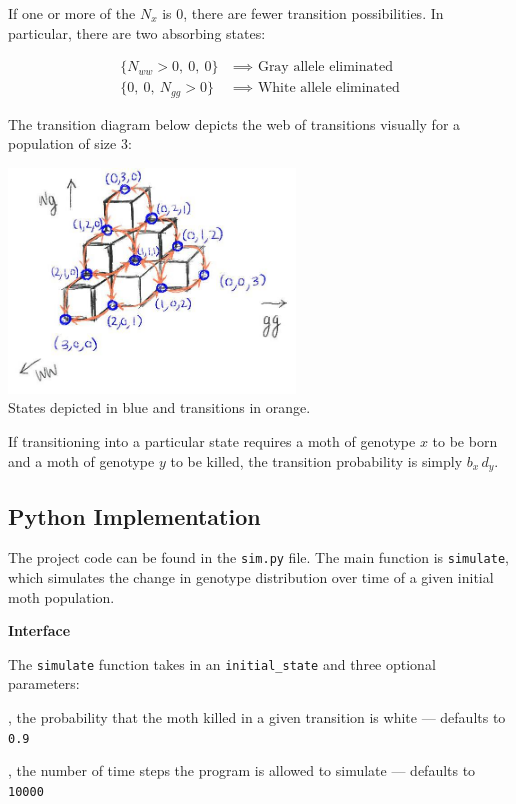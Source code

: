 \documentclass[leqno]{article}
\begin{document}
If one or more of the $N_x$ is $0$, there are fewer transition possibilities. In particular, there are two absorbing states:

\begin{align*}
\{N_{ww} > 0,\ 0,\ 0\} &\ \implies \text{ Gray allele eliminated}\\
\{0,\ 0,\ N_{gg} > 0\} &\ \implies \text{ White allele eliminated}
\end{align*} 

The transition diagram below depicts the web of transitions visually for a population of size $3$:

\begin{center}
\includegraphics[width=3in]{transition_diagram.jpg}{\\States depicted in blue and transitions in orange.}
\end{center}

If transitioning into a particular state requires a moth of genotype $x$ to be born and a moth of genotype $y$ to be killed, the transition probability is simply $b_{x}\, d_{y}$.

\subsection{Python Implementation}

The project code can be found in the {\tt sim.py} file. The main function is {\tt simulate}, which simulates the change in genotype distribution over time of a given initial moth population.


\textbf{Interface}

The {\tt simulate} function takes in an {\tt initial\_state} and three optional parameters: 

, the probability that the moth killed in a given transition is white --- defaults to {\tt 0.9} 

, the number of time steps the program is allowed to simulate --- defaults to {\tt 10000}
\end{document}
